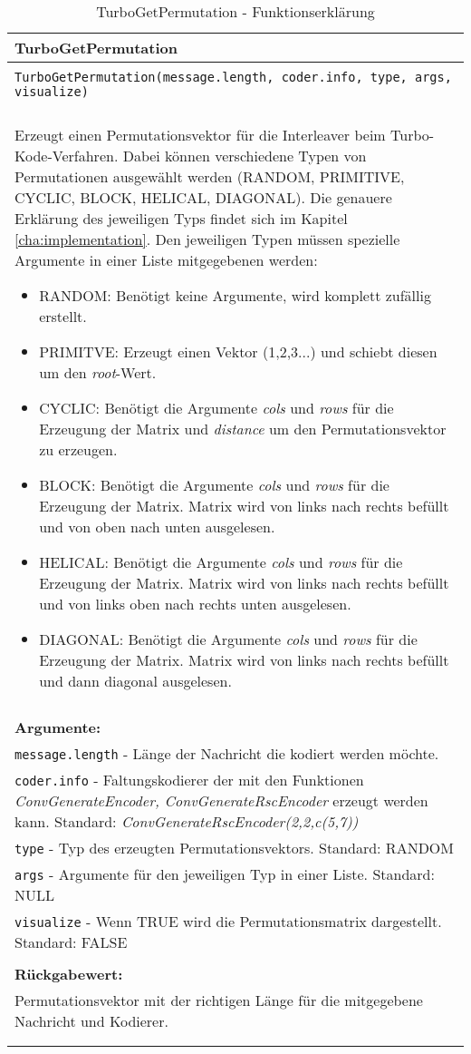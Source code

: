 \begin{longtable}{|p{\textwidth}|}
\hline
\rowcolor{lightblue}TurboGetPermutation\\
\hline
\\
\texttt{TurboGetPermutation(message.length, coder.info, type, args, visualize)}\\
\\
Erzeugt einen Permutationsvektor für die Interleaver beim Turbo-Kode-Verfahren. Dabei können verschiedene Typen von Permutationen ausgewählt werden (RANDOM, PRIMITIVE, CYCLIC, BLOCK, HELICAL, DIAGONAL). Die genauere Erklärung des jeweiligen Typs findet sich im Kapitel \ref{cha:implementation}. Den jeweiligen Typen müssen spezielle Argumente in einer Liste mitgegebenen werden:
\begin{itemize}
\item RANDOM: Benötigt keine Argumente, wird komplett zufällig erstellt.
\item PRIMITVE: Erzeugt einen Vektor (1,2,3...) und schiebt diesen um den \emph{root}-Wert.
\item CYCLIC: Benötigt die Argumente \emph{cols} und \emph{rows} für die Erzeugung der Matrix und \emph{distance} um den Permutationsvektor zu erzeugen.
\item BLOCK: Benötigt die Argumente \emph{cols} und \emph{rows} für die Erzeugung der Matrix. Matrix wird von links nach rechts befüllt und von oben nach unten ausgelesen.
\item HELICAL: Benötigt die Argumente \emph{cols} und \emph{rows} für die Erzeugung der Matrix. Matrix wird von links nach rechts befüllt und von links oben nach rechts unten ausgelesen.
\item DIAGONAL: Benötigt die Argumente \emph{cols} und \emph{rows} für die Erzeugung der Matrix. Matrix wird von links nach rechts befüllt und dann diagonal ausgelesen.
\end{itemize} \\
\\
\textbf{Argumente:}\\
\texttt{message.length} - Länge der Nachricht die kodiert werden möchte.\\
\texttt{coder.info} - Faltungskodierer der mit den Funktionen \emph{ConvGenerateEncoder, ConvGenerateRscEncoder} erzeugt werden kann. Standard: \emph{ConvGenerateRscEncoder(2,2,c(5,7))}\\
\texttt{type} - Typ des erzeugten Permutationsvektors. Standard: RANDOM\\
\texttt{args} - Argumente für den jeweiligen Typ in einer Liste. Standard: NULL\\
\texttt{visualize} - Wenn TRUE wird die Permutationsmatrix dargestellt. Standard: FALSE\\
\\
\textbf{Rückgabewert:}\\
Permutationsvektor mit der richtigen Länge für die mitgegebene Nachricht und Kodierer.\\
\\
\hline
\caption{TurboGetPermutation - Funktionserklärung}
\end{longtable}